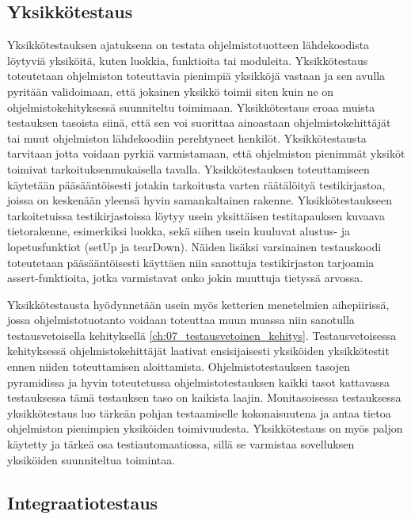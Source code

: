   \subsection{Yksikkötestaus} \label{ch:07_yksikkotestaus}

  Yksikkötestauksen ajatuksena on testata ohjelmistotuotteen lähdekoodista löytyviä yksiköitä, kuten luokkia, funktioita tai moduleita.
  Yksikkötestaus toteutetaan ohjelmiston toteuttavia pienimpiä yksikköjä vastaan ja sen avulla pyritään validoimaan, että jokainen yksikkö toimii siten kuin ne on ohjelmistokehityksessä suunniteltu toimimaan.
  Yksikkötestaus eroaa muista testauksen tasoista siinä, että sen voi suorittaa ainoastaan ohjelmistokehittäjät tai muut ohjelmiston lähdekoodiin perehtyneet henkilöt.
  Yksikkötestausta tarvitaan jotta voidaan pyrkiä varmistamaan, että ohjelmiston pienimmät yksiköt toimivat tarkoituksenmukaisella tavalla.
  Yksikkötestauksen toteuttamiseen käytetään pääsääntöisesti jotakin tarkoitusta varten räätälöityä testikirjastoa, joissa on keskenään yleensä hyvin samankaltainen rakenne.
  Yksikkötestaukseen tarkoitetuissa testikirjastoissa löytyy usein yksittäisen testitapauksen kuvaava tietorakenne, esimerkiksi luokka, sekä siihen usein kuuluvat alustus- ja lopetusfunktiot (setUp ja tearDown).
  Näiden lisäksi varsinainen testauskoodi toteutetaan pääsääntöisesti käyttäen niin sanottuja testikirjaston tarjoamia assert-funktioita, jotka varmistavat onko jokin muuttuja tietyssä arvossa.

  Yksikkötestausta hyödynnetään usein myös ketterien menetelmien aihepiirissä, jossa ohjelmistotuotanto voidaan toteuttaa muun muassa niin sanotulla testausvetoisella kehityksellä \ref{ch:07_testausvetoinen_kehitys}.
  Testausvetoisessa kehityksessä ohjelmistokehittäjät laativat ensisijaisesti yksiköiden yksikkötestit ennen niiden toteuttamisen aloittamista.
  Ohjelmistotestauksen tasojen pyramidissa ja hyvin toteutetussa ohjelmistotestauksen kaikki tasot kattavassa testauksessa tämä testauksen taso on kaikista laajin.
  Monitasoisessa testauksessa yksikkötestaus luo tärkeän pohjan testaamiselle kokonaisuutena ja antaa tietoa ohjelmiston pienimpien yksiköiden toimivuudesta.
  Yksikkötestaus on myös paljon käytetty ja tärkeä osa testiautomaatiossa, sillä se varmistaa sovelluksen yksiköiden suunniteltua toimintaa.

  \subsection{Integraatiotestaus} \label{ch:07_integraatiotestaus}


